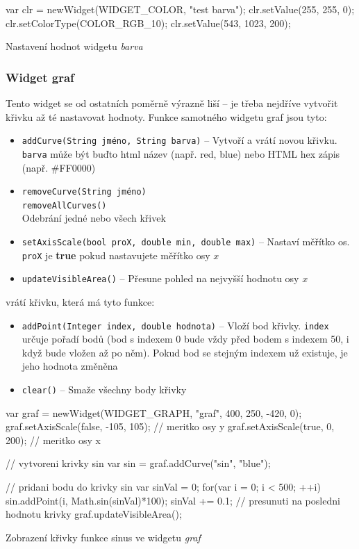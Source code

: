 \documentclass[12pt, a4paper, oneside]{article}
\newcommand{\It}{\textit}  %
\begin{document}
\begin{listing}[H]
\begin{jscode}
var clr = newWidget(WIDGET_COLOR, "test barva");
clr.setValue(255, 255, 0);
clr.setColorType(COLOR_RGB_10);
clr.setValue(543, 1023, 200);
\end{jscode}
\caption{Nastavení hodnot widgetu \It{barva}}
\end{listing}

\subsubsection*{Widget graf}
Tento widget se od ostatních poměrně výrazně liší -- je třeba nejdříve vytvořit křivku až té nastavovat hodnoty. Funkce samotného widgetu graf jsou tyto:
\begin{itemize}
    \item {\color{blue}\verb/addCurve(String jméno, String barva)/} -- Vytvoří a vrátí novou křivku. \verb/barva/ může být buďto html název (např. red, blue) nebo HTML hex zápis (např. \#FF0000)
    \item {\color{blue}\verb/removeCurve(String jméno)/} \\
        {\color{blue}\verb/removeAllCurves()/} \\
        Odebrání jedné nebo všech křivek
    \item {\color{blue}\verb/setAxisScale(bool proX, double min, double max)/} -- Nastaví měřítko os. \verb/proX/ je {\bf true} pokud nastavujete měřítko osy $x$
    \item {\color{blue}\verb/updateVisibleArea()/} -- Přesune pohled na nejvyšší hodnotu osy $x$
\end{itemize}

 vrátí křivku, která má tyto funkce:

\begin{itemize}
    \item {\color{blue}\verb/addPoint(Integer index, double hodnota)/} -- Vloží bod křivky. \verb/index/ určuje pořadí bodů (bod s indexem 0 bude vždy před bodem s indexem 50, i když bude vložen až po něm). Pokud bod se stejným indexem už existuje, je jeho hodnota změněna
    \item {\color{blue}\verb/clear()/} -- Smaže všechny body křivky
\end{itemize}

\begin{listing}[H]
\begin{jscode}
var graf = newWidget(WIDGET_GRAPH, "graf", 400, 250, -420, 0);
graf.setAxisScale(false, -105, 105); // meritko osy y
graf.setAxisScale(true, 0, 200); // meritko osy x

// vytvoreni krivky sin
var sin = graf.addCurve("sin", "blue"); 

// pridani bodu do krivky sin
var sinVal = 0;
for(var i = 0; i < 500; ++i) {
    sin.addPoint(i, Math.sin(sinVal)*100);
    sinVal += 0.1;
}
// presunuti na posledni hodnotu krivky
graf.updateVisibleArea(); 
\end{jscode}
\caption{Zobrazení křivky funkce sinus ve widgetu \It{graf}}
\end{listing}
\end{document}
